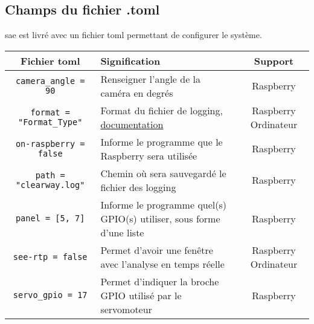 \subsection{Champs du fichier .toml}
\label{sec:executionTOML_clearWay}
\gls{sae} est livré avec un fichier toml permettant de configurer le système.
\begin{table}[H]
    \centering
    \begin{tabularx}{\linewidth}{|c|X|c|}
        \hline
        \rowcolor{tableColorDark} Fichier toml & Signification & Support   \\
        \hline
        \texttt{camera\_angle = 90}                  & Renseigner l'angle de la caméra en degrés                                                                                                                         & Raspberry               \\\hline
        \texttt{format = "Format\_Type"}             & Format du fichier de logging, \href{https://docs.python.org/3/howto/logging-cookbook.html\#formatting-styles}{documentation}                                      & Raspberry Ordinateur    \\\hline
        \texttt{on-raspberry = false}                & Informe le programme que le Raspberry sera utilisée                                                                                                               & Raspberry               \\\hline
        \texttt{path = "clearway.log"}               & Chemin où sera sauvegardé le fichier des logging                                                                                                                  & Raspberry               \\\hline
        \texttt{panel = [5, 7]}                      & Informe le programme quel(s) GPIO(s) utiliser, sous forme d'une liste                                                                                             & Raspberry               \\\hline
        \texttt{see-rtp = false}                     & Permet d'avoir une fenêtre avec l'analyse en temps réelle                                                                                                         & Raspberry Ordinateur    \\\hline
        \texttt{servo\_gpio = 17}                    & Permet d'indiquer la broche GPIO utilisé par le servomoteur                                                                                                       & Raspberry               \\\hline

\end{tabularx}
\end{table}
